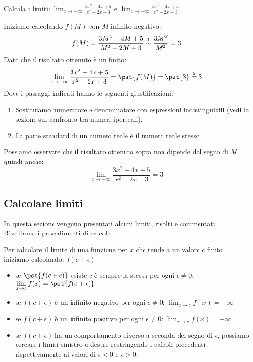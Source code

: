 \begin{esempio}
Calcola i limiti: 
\(\displaystyle \lim_{x \to -\infty}\frac{3x^2-4x+5}{x^2-2x+3}\)
\quad e \quad
\(\displaystyle \lim_{x \to +\infty}\frac{3x^2-4x+5}{x^2-2x+3}\)

Iniziamo calcolando \(f(M)\) con \(M\) infinito negativo:
\[f(M) = \dfrac{3M^2-4M+5}{M^2-2M+3} \stackrel{1}{\sim} 
\dfrac{3\cancel{M^2}}{\cancel{M^2}} = 3\]
Dato che il risultato ottenuto è un finito:
\[\lim_{x \to +\infty}\frac{3x^2-4x+5}{x^2-2x+3} = 
  \pst{f(M)} = \pst{3} \stackrel{2}{=} 3\]
Dove i passaggi indicati hanno le seguenti giustificazioni:
\begin{enumerate} [nosep]
\item Sostituiamo numeratore e denominatore con espressioni indistinguibili 
(vedi la sezione sul confronto tra numeri iperreali).
\item La parte standard di un numero reale è il numero reale stesso.
\end{enumerate}
Possiamo osservare che il risultato ottenuto sopra non dipende dal segno di 
\(M\) quindi anche: 
\[\displaystyle \lim_{x \to +\infty}\frac{3x^2-4x+5}{x^2-2x+3} = 3\]
\begin{center} \limiteallinfinito \end{center}
\end{esempio}

\subsection{Calcolare limiti}
\label{subsec:cont_limiti_calcolo}

In questa sezione vengono presentati alcuni limiti, risolti e commentati.
Rivediamo i procedimenti di calcolo.
\begin{procedura}
Per calcolare il limite di una funzione per \(x\) che tende a un 
valore \(c\) finito iniziamo calcolando:
\(f(c + \epsilon)\)
\begin{itemize}
\item 
se \(\pst{f(c + \epsilon)}\) esiste e è sempre la stessa 
per ogni \(\epsilon \neq 0\): \quad 
\(\displaystyle \lim_{x \to c}f(x) = \pst{f(c + \epsilon)}\)
\item 
se \(f(c + \epsilon)\) è un infinito negativo per ogni \(\epsilon \neq 0\): 
\quad \(\displaystyle \lim_{x \to c}f(x) = -\infty\)
\item 
se \(f(c + \epsilon)\) è un infinito positivo per ogni \(\epsilon \neq 0\): 
\quad \(\displaystyle \lim_{x \to c}f(x) = +\infty\)
\item 
se \(f(c + \epsilon)\) ha un comportamento diverso a seconda del 
segno di \(\epsilon\), possiamo cercare i limiti sinistro o destro
restringendo i calcoli precedenti rispettivamente ai valori di 
\(\epsilon < 0\) e \(\epsilon > 0\). 
\end{itemize}
\end{procedura}


